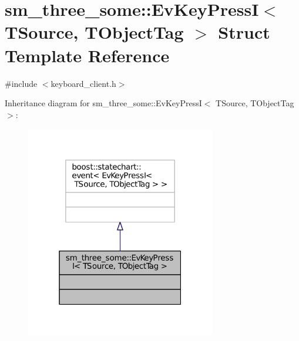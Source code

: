 \hypertarget{structsm__three__some_1_1EvKeyPressI}{}\section{sm\+\_\+three\+\_\+some\+:\+:Ev\+Key\+PressI$<$ T\+Source, T\+Object\+Tag $>$ Struct Template Reference}
\label{structsm__three__some_1_1EvKeyPressI}


{\ttfamily \#include $<$keyboard\+\_\+client.\+h$>$}



Inheritance diagram for sm\+\_\+three\+\_\+some\+:\+:Ev\+Key\+PressI$<$ T\+Source, T\+Object\+Tag $>$\+:
\nopagebreak
\begin{figure}[H]
\begin{center}
\leavevmode
\includegraphics[width=235pt]{structsm__three__some_1_1EvKeyPressI__inherit__graph}
\end{center}
\end{figure}


